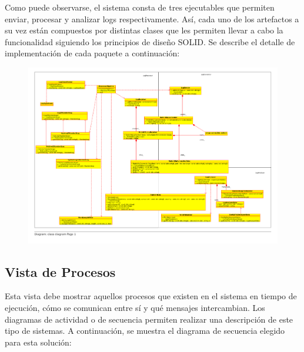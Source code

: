 \documentclass[11pt]{article}
\begin{document}
Como puede observarse, el sistema consta de tres ejecutables que permiten enviar, procesar y analizar logs respectivamente. Así, cada uno de los artefactos a su vez están compuestos por distintas clases que les permiten llevar a cabo la funcionalidad siguiendo los principios de diseño SOLID. Se describe el detalle de implementación de cada paquete a continuación:

\begin{landscape}
\begin{center}
 \begin{figure}[H]
 \begin{center}
\includegraphics[scale=0.85]{classes01.pdf}
   \label{fig:classes_per_component}
 \end{center}
 \end{figure}
\end{center}
\end{landscape}
\restoregeometry

\subsection{Vista de Procesos}
Esta vista debe mostrar aquellos procesos que existen en el sistema en tiempo de ejecución, cómo se comunican entre sí y qué mensajes intercambian. Los diagramas de actividad o de secuencia permiten realizar una descripción de este tipo de sistemas. A continuación, se muestra el diagrama de secuencia elegido para esta solución:
\end{document}
